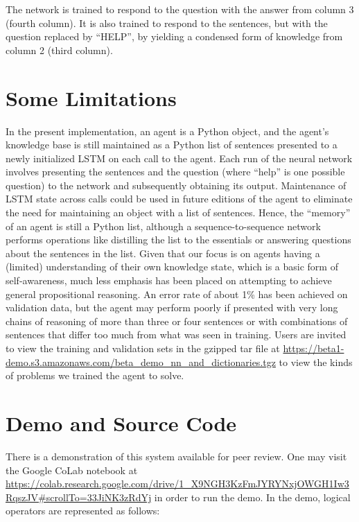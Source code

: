 \documentclass{article}
\begin{document}
The network is trained to respond to the question with the answer from column 3 (fourth column). It is also trained to respond to the sentences, but with the question replaced by “HELP”, by yielding a condensed form of knowledge from column 2 (third column).

\section{Some Limitations}

In the present implementation, an agent is a Python object, and the agent’s knowledge base is still maintained as a Python list of sentences presented to a newly initialized LSTM on each call to the agent. Each run of the neural network involves presenting the sentences and the question (where “help” is one possible question) to the network and subsequently obtaining its output. Maintenance of LSTM state across calls could be used in future editions of the agent to eliminate the need for maintaining an object with a list of sentences. Hence, the “memory” of an agent is still a Python list, although a sequence-to-sequence network performs operations like distilling the list to the essentials or answering questions about the sentences in the list.
Given that our focus is on agents having a (limited) understanding of their own knowledge state, which is a basic form of self-awareness, much less emphasis has been placed on attempting to achieve general propositional reasoning. An error rate of about 1\% has been achieved on validation data, but the agent may perform poorly if presented with very long chains of reasoning of more than three or four sentences or with combinations of sentences that differ too much from what was seen in training. Users are invited to view the training and validation sets in the gzipped tar file at \url{https://beta1-demo.s3.amazonaws.com/beta_demo_nn_and_dictionaries.tgz} to view the kinds of problems we trained the agent to solve.

\section{Demo and Source Code}

There is a demonstration of this system available for peer review. One may visit the Google CoLab notebook at \url{https://colab.research.google.com/drive/1_X9NGH3KzFmJYRYNxjOWGH1Iw3RqszJV#scrollTo=33JiNK3zRdYj} in order to run the demo.
In the demo, logical operators are represented as follows:
\end{document}
